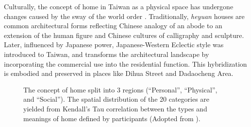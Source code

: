 Culturally, the concept of home in Taiwan as a physical space has undergone changes caused by the sway of the world order \parencite{沈孟穎2015台灣現代住宅設計之轉化}. Traditionally, \textit{heyuan} houses are common architectural forms reflecting Chinese analogy of an abode to an extension of the human figure and Chinese cultures of calligraphy and sculpture. Later, influenced by Japanese power, Japanese-Western Eclectic style was introduced to Taiwan, and  transforms the architectural landscape by incorporating the commercial use into the residential function. This hybridization is embodied and preserved in places like Dihua Street and Dadaocheng Area.

\begin{figure}[H]
  \begin{minipage}{\textwidth}
    \centering
    \hspace*{.2in}
    \caption{The concept of home split into 3 regions (``Personal'', ``Physical'', and ``Social''). The spatial distribution of the 20 categories are yielded from Kendall's Tau correlation between the types and meanings of home defined by participants  (Adopted from \textcite{sixsmith1986meaning}).}
    \label{fig:home_regions}
  \end{minipage}
\end{figure}


